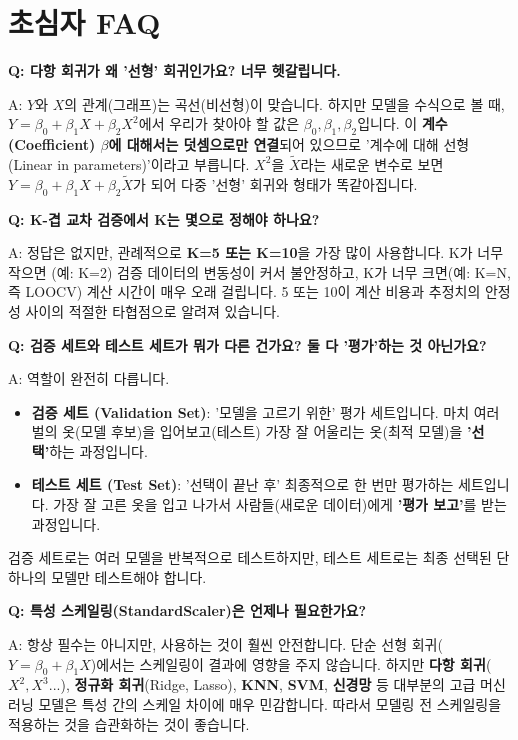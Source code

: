 \documentclass[11pt,a4paper]{book}
\theoremstyle{definition}
\begin{document}
\section{초심자 FAQ}

\textbf{Q: 다항 회귀가 왜 '선형' 회귀인가요? 너무 헷갈립니다.}

A: $Y$와 $X$의 관계(그래프)는 곡선(비선형)이 맞습니다. 하지만 모델을 수식으로 볼 때, $Y = \beta_0 + \beta_1 X + \beta_2 X^2$에서 우리가 찾아야 할 값은 $\beta_0, \beta_1, \beta_2$입니다. 이 \textbf{계수(Coefficient) $\beta$에 대해서는 덧셈으로만 연결}되어 있으므로 '계수에 대해 선형(Linear in parameters)'이라고 부릅니다. $X^2$을 $\tilde{X}$라는 새로운 변수로 보면 $Y = \beta_0 + \beta_1 X + \beta_2 \tilde{X}$가 되어 다중 '선형' 회귀와 형태가 똑같아집니다.

\textbf{Q: K-겹 교차 검증에서 K는 몇으로 정해야 하나요?}

A: 정답은 없지만, 관례적으로 \textbf{K=5 또는 K=10}을 가장 많이 사용합니다.
K가 너무 작으면 (예: K=2) 검증 데이터의 변동성이 커서 불안정하고, K가 너무 크면(예: K=N, 즉 LOOCV) 계산 시간이 매우 오래 걸립니다. 5 또는 10이 계산 비용과 추정치의 안정성 사이의 적절한 타협점으로 알려져 있습니다.

\textbf{Q: 검증 세트와 테스트 세트가 뭐가 다른 건가요? 둘 다 '평가'하는 것 아닌가요?}

A: 역할이 완전히 다릅니다.
\begin{itemize}
    \item \textbf{검증 세트 (Validation Set)}: '모델을 고르기 위한' 평가 세트입니다. 마치 여러 벌의 옷(모델 후보)을 입어보고(테스트) 가장 잘 어울리는 옷(최적 모델)을 \textbf{'선택'}하는 과정입니다.
    \item \textbf{테스트 세트 (Test Set)}: '선택이 끝난 후' 최종적으로 한 번만 평가하는 세트입니다. 가장 잘 고른 옷을 입고 나가서 사람들(새로운 데이터)에게 \textbf{'평가 보고'}를 받는 과정입니다.
\end{itemize}
검증 세트로는 여러 모델을 반복적으로 테스트하지만, 테스트 세트로는 최종 선택된 단 하나의 모델만 테스트해야 합니다.

\textbf{Q: 특성 스케일링(StandardScaler)은 언제나 필요한가요?}

A: 항상 필수는 아니지만, 사용하는 것이 훨씬 안전합니다.
단순 선형 회귀($Y=\beta_0+\beta_1 X$)에서는 스케일링이 결과에 영향을 주지 않습니다.
하지만 \textbf{다항 회귀}($X^2, X^3...$), \textbf{정규화 회귀}(Ridge, Lasso), \textbf{KNN}, \textbf{SVM}, \textbf{신경망} 등 대부분의 고급 머신러닝 모델은 특성 간의 스케일 차이에 매우 민감합니다. 따라서 모델링 전 스케일링을 적용하는 것을 습관화하는 것이 좋습니다.
\end{document}
